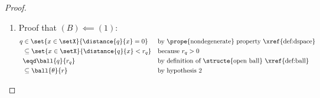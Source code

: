 \begin{proof}
\begin{enumerate}

  \item Proof that $(B)\impliedby(1)$:
    \begin{align*}
      q &\in    \set{x\in\setX}{\distance{q}{x}=0}
        &&    \text{by \prope{nondegenerate} property \xref{def:dspace}}
      \\&\subseteq \set{x\in\setX}{\distance{q}{x}<r_q}
        &&    \text{because $r_q>0$}
      \\&\eqd \ball{q}{r_q}
        &&    \text{by definition of \structe{open ball} \xref{def:ball}}
      \\&\subseteq \ball{\theta}{r}
        &&    \text{by hypothesis 2}
    \end{align*}
\end{enumerate}
\end{proof}

